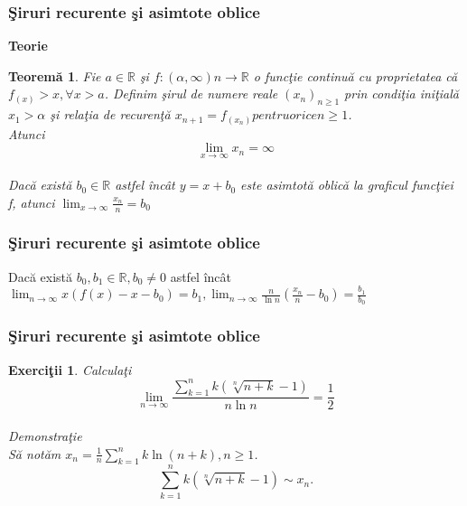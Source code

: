 \documentclass{beamer}
\theoremstyle{plain}
\newtheorem{te}[de]{Teorem\u a }
\newtheorem{ex}[de]{Exerci\c tii}
\begin{document}
\frame
{
\frametitle{\c Siruri recurente \c si asimtote oblice}
\textbf{Teorie}
\begin{te}
Fie \(a\in \mathbb{R}\) \c si \(f: \left ( \alpha ,\infty  \right )n \to \mathbb{R}\) o func\c tie continu\u a cu proprietatea c\u a \(f_{(x)}> x, \forall x > a\). Definim \c sirul de numere reale \(\left ( x_{n} \right )_{n\geq 1}\) prin condi\c tia ini\c tial\u a \(x_{1}> \alpha\) \c si rela\c tia de recuren\c t\u a \(x_{n+1} = f_{\left ( x_{n} \right )} pentru orice  n\geq 1\).
\\ Atunci 
\begin{displaymath}
 \lim_{x \to \infty }x_{n} = \infty
\end{displaymath}
\\ Dac\u a exist\u a \(b_{0}\in \mathbb{R}\) astfel \^ inc\^ at \(y = x + b_{0}\) este asimtot\u a oblic\u a la graficul func\c tiei f, atunci
\(\lim_{x \to \infty }\frac{x_{n}}{n}=b_{0}\)
\end{te}
}
\frame
{
\frametitle{\c Siruri recurente \c si asimtote oblice}
Dac\u a exist\u a \(b_{0}, b_{1}\in \mathbb{R}, b_{0 }\neq 0\) astfel \^ inc\^ at 
\(\lim_{n \to \infty }x\left ( f\left ( x \right )-x-b_{0} \right )= b_{1},
\lim_{n \to \infty } \frac{n}{\ln n}\left ( \frac{x_{n}}{n} -b_{0}\right )=\frac{b_{1}}{b_{0}}\)

}
\frame
{
\frametitle{\c Siruri recurente \c si asimtote oblice}
\begin{ex}
Calcula\c ti
\begin{displaymath}
 \lim_{n \to \infty }\frac{\sum_{k=1}^{n}k\left ( \sqrt[n]{n+k} -1\right )}{n\ln n } = \frac{1}{2}
\end{displaymath}
\\ Demonstra\c tie 
\\ S\u a not\u am \(x_{n} = \frac{1}{n}\sum_{k=1}^{n} k \ln \left ( n+k \right ), n \geq 1\). 
\begin{displaymath}
 \sum_{k=1}^{n}k\left ( \sqrt[n]{n+k}-1 \right )\sim x_{n}. \label{eq:2.1} \tag{2.1}
\end{displaymath}
\end{ex}
}
\frame
\end{document}
